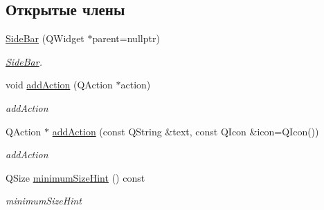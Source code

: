 \subsection*{Открытые члены}
\begin{DoxyCompactItemize}
\item 
\hyperlink{classSideBar_a2a5215a713fe300f8e7b2407017db411}{Side\+Bar} (Q\+Widget $\ast$parent=nullptr)
\begin{DoxyCompactList}\small\item\em \hyperlink{classSideBar}{Side\+Bar}. \end{DoxyCompactList}\item 
void \hyperlink{classSideBar_abec6727f29e75af996bc71196c690eaa}{add\+Action} (Q\+Action $\ast$action)
\begin{DoxyCompactList}\small\item\em add\+Action \end{DoxyCompactList}\item 
Q\+Action $\ast$ \hyperlink{classSideBar_abcc7410af74a6e776a4d708a396f47ec}{add\+Action} (const Q\+String \&text, const Q\+Icon \&icon=Q\+Icon())
\begin{DoxyCompactList}\small\item\em add\+Action \end{DoxyCompactList}\item 
Q\+Size \hyperlink{classSideBar_a3b46466ef84c9f89677478f8b1f5bf36}{minimum\+Size\+Hint} () const
\begin{DoxyCompactList}\small\item\em minimum\+Size\+Hint \end{DoxyCompactList}\end{DoxyCompactItemize}
